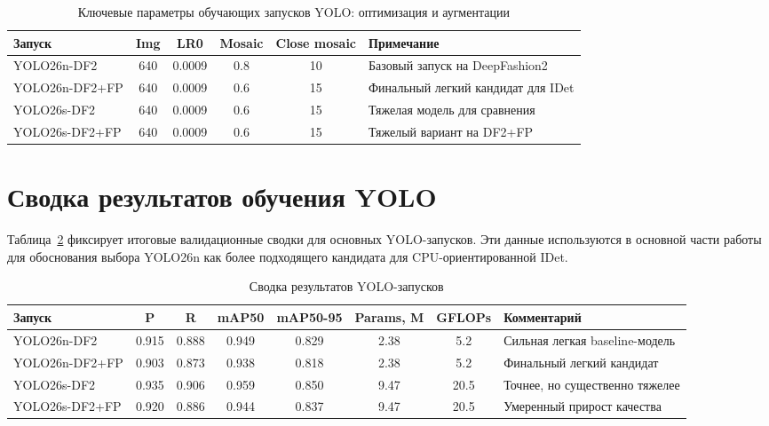 \documentclass[12pt,a4paper,oneside,openany]{report}
\renewcommand{\arraystretch}{1.12}
\begin{document}
\begin{table}[H]
\centering
\caption{Ключевые параметры обучающих запусков YOLO: оптимизация и аугментации}
\label{tab:appendix_training_optimization}
\small
\setlength{\tabcolsep}{5pt}
\renewcommand{\arraystretch}{1.08}
\begin{tabular*}{\linewidth}{@{\extracolsep{\fill}}lcccc l@{}}
\toprule
Запуск & Img & LR0 & Mosaic & Close mosaic & Примечание \\
\midrule
YOLO26n-DF2    & 640 & 0.0009 & 0.8 & 10 & Базовый запуск на DeepFashion2 \\
YOLO26n-DF2+FP & 640 & 0.0009 & 0.6 & 15 & Финальный легкий кандидат для IDet \\
YOLO26s-DF2    & 640 & 0.0009 & 0.6 & 15 & Тяжелая модель для сравнения \\
YOLO26s-DF2+FP & 640 & 0.0009 & 0.6 & 15 & Тяжелый вариант на DF2+FP \\
\bottomrule
\end{tabular*}
\end{table}


\section{Сводка результатов обучения YOLO}

Таблица~\ref{tab:appendix_yolo_results} фиксирует итоговые валидационные сводки для основных YOLO-запусков. Эти данные используются в основной части работы для обоснования выбора YOLO26n как более подходящего кандидата для CPU-ориентированной IDet.

\begin{table}[H]
\centering
\caption{Сводка результатов YOLO-запусков}
\label{tab:appendix_yolo_results}
\scriptsize
\setlength{\tabcolsep}{3pt}
\renewcommand{\arraystretch}{1.05}
\begin{tabular*}{\linewidth}{@{\extracolsep{\fill}}lcccccc l@{}}
\toprule
Запуск & P & R & mAP50 & mAP50-95 & Params, M & GFLOPs & Комментарий \\
\midrule
YOLO26n-DF2    & 0.915 & 0.888 & 0.949 & 0.829 & 2.38 & 5.2  & Сильная легкая baseline-модель \\
YOLO26n-DF2+FP & 0.903 & 0.873 & 0.938 & 0.818 & 2.38 & 5.2  & Финальный легкий кандидат \\
YOLO26s-DF2    & 0.935 & 0.906 & 0.959 & 0.850 & 9.47 & 20.5 & Точнее, но существенно тяжелее \\
YOLO26s-DF2+FP & 0.920 & 0.886 & 0.944 & 0.837 & 9.47 & 20.5 & Умеренный прирост качества \\
\bottomrule
\end{tabular*}
\end{table}
\end{document}
